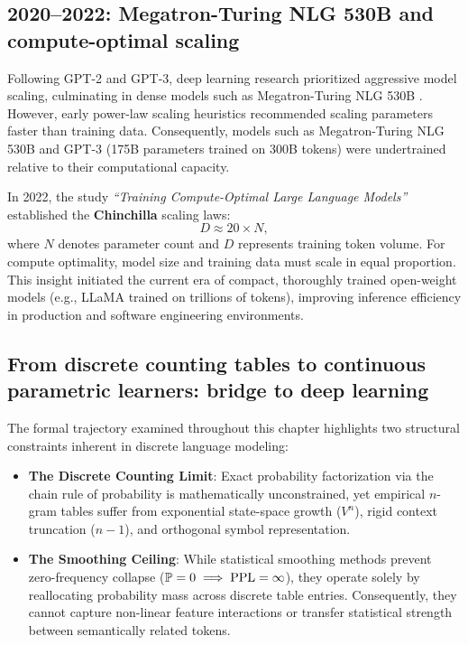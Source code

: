\documentclass[../../main.tex]{subfiles}
\begin{document}
\subsection{2020--2022: Megatron-Turing NLG 530B and compute-optimal scaling}
\label{subsec:milestone_scaling}

Following GPT-2 and GPT-3, deep learning research prioritized aggressive model scaling, culminating in dense models such as Megatron-Turing NLG 530B \cite{smith2022mtnlg}. However, early power-law scaling heuristics \cite{kaplan2020} recommended scaling parameters faster than training data. Consequently, models such as Megatron-Turing NLG 530B and GPT-3 (175B parameters trained on 300B tokens) were undertrained relative to their computational capacity.

In 2022, the study \textit{``Training Compute-Optimal Large Language Models''} \cite{hoffmann2022} established the \textbf{Chinchilla} scaling laws:
\begin{equation}
\label{eq:chinchilla_ratio}
D \approx 20 \times N,
\end{equation}
where $N$ denotes parameter count and $D$ represents training token volume. For compute optimality, model size and training data must scale in equal proportion. This insight initiated the current era of compact, thoroughly trained open-weight models (e.g., LLaMA \cite{touvron2023llama} trained on trillions of tokens), improving inference efficiency in production and software engineering environments.

\subsection{From discrete counting tables to continuous parametric learners: bridge to deep learning}
\label{subsec:bridge_to_ch02}

The formal trajectory examined throughout this chapter highlights two structural constraints inherent in discrete language modeling:
\begin{itemize}
    \item \textbf{The Discrete Counting Limit}: Exact probability factorization via the chain rule of probability is mathematically unconstrained, yet empirical $n$-gram tables suffer from exponential state-space growth ($V^n$), rigid context truncation ($n-1$), and orthogonal symbol representation.
    \item \textbf{The Smoothing Ceiling}: While statistical smoothing methods prevent zero-frequency collapse ($\mathbb{P}=0 \implies \mathrm{PPL}=\infty$), they operate solely by reallocating probability mass across discrete table entries. Consequently, they cannot capture non-linear feature interactions or transfer statistical strength between semantically related tokens.
\end{itemize}
\end{document}
